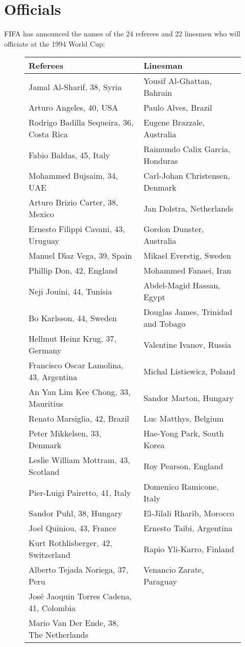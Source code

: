 \chapter{Officials}
\newline
\newline
FIFA has announced the names of the 24 referees and 22 linesmen who will officiate at the 1994 World Cup:
\begin{figure}[H]
\begin{tabular}{l l}
Referees & Linesman \\ \hline
Jamal Al-Sharif, 38, Syria & Yousif Al-Ghattan, Bahrain \\
Arturo Angeles, 40, USA & Paulo Alves, Brazil \\
Rodrigo Badilla Sequeira, 36, Costa Rica & Eugene Brazzale, Australia \\
Fabio Baldas, 45, Italy & Raimundo Calix Garcia, Honduras \\
Mohammed Bujsaim, 34, UAE  & Carl-Johan Christensen, Denmark \\
Arturo Brizio Carter, 38, Mexico & Jan Dolstra, Netherlands \\
Ernesto Filippi Cavani, 43, Uruguay & Gordon Dunster, Australia \\
Manuel D{\.i}az Vega, 39, Spain & Mikael Everstig, Sweden \\
Phillip Don, 42, England & Mohammed Fanaei, Iran \\
Neji Jouini, 44, Tunisia & Abdel-Magid Hassan, Egypt \\
Bo Karlsson, 44, Sweden & Douglas James, Trinidad and Tobago \\
Hellmut Heinz Krug, 37, Germany & Valentine Ivanov, Russia \\
Francisco Oscar Lamolina, 43, Argentina & Michal Listiewicz, Poland \\
An Yan Lim Kee Chong, 33, Mauritius & Sandor Marton, Hungary \\
Renato Marsiglia, 42, Brazil & Luc Matthys, Belgium \\
Peter Mikkelsen, 33, Denmark & Hae-Yong Park, South Korea \\
Leslie William Mottram, 43, Scotland & Roy Pearson, England \\
Pier-Luigi Pairetto, 41, Italy  & Domenico Ramicone, Italy \\
Sandor Puhl, 38, Hungary & El-Jilali Rharib, Morocco \\
Joel Quiniou, 43, France & Ernesto Taibi, Argentina \\
Kurt Rothlisberger, 42, Switzerland & Rapio Yli-Karro, Finland \\
Alberto Tejada Noriega, 37, Peru & Venancio Zarate, Paraguay \\
Jos{\'e} Jaoquin Torres Cadena, 41, Colombia & \\
Mario Van Der Ende, 38, The Netherlands & \\
\end{tabular}
\end{figure}
